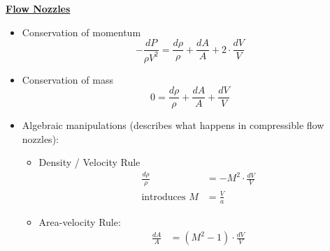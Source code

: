 \Large \textbf{\underline{\color{blue}Flow Nozzles\color{black}}}
\vspace{3mm}

\begin{itemize}
    \item Conservation of momentum
    \begin{equation*}
        -\frac{dP}{\rho V^2} = \frac{d\rho}{\rho} + \frac{dA}{A} + 2 \cdot \frac{dV}{V}
    \end{equation*}
    \item Conservation of mass
    \begin{equation*}
        0 = \frac{d\rho}{\rho} + \frac{dA}{A} + \frac{dV}{V}
    \end{equation*}
    \item Algebraic manipulations (describes what happens in compressible flow nozzles):
    \begin{itemize}
        \item Density / Velocity Rule
        \begin{align*}
            \frac{d\rho}{\rho} &= - M^2 \cdot \frac{dV}{V} \\
            \text{introduces } M &= \frac{V}{a}
        \end{align*}
        \item Area-velocity Rule:
        \begin{align*}
            \frac{dA}{A} &= (M^2 - 1) \cdot \frac{dV}{V}
        \end{align*}
    \end{itemize}
\end{itemize}

